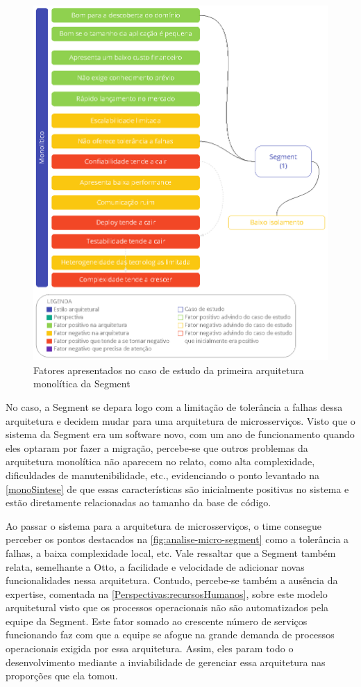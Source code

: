 \begin{figure}[h]
  \centering
  \includegraphics[keepaspectratio=true,scale=1]{figuras/analise-mono-segment-1.eps}
  \caption{Fatores apresentados no caso de estudo da primeira arquitetura monolítica da Segment\label{fig:analise-mono-segment-1}}
\end{figure}

No caso, a Segment se depara logo com a limitação de tolerância a falhas dessa arquitetura e decidem
mudar para uma arquitetura de microsserviços. Visto que o sistema da Segment era um software novo,
com um ano de funcionamento quando eles optaram por fazer a migração, percebe-se que outros problemas
da arquitetura monolítica não aparecem no relato, como alta complexidade, dificuldades de
manutenibilidade, etc., evidenciando o ponto levantado na \autoref{monoSintese} de que essas
características são inicialmente positivas no sistema e estão diretamente relacionadas ao tamanho da
base de código.

Ao passar o sistema para a arquitetura de microsserviços, o time consegue perceber os pontos
destacados na \autoref{fig:analise-micro-segment} como a tolerância a falhas, a baixa complexidade
local, etc. Vale ressaltar que a Segment também relata, semelhante a Otto, a facilidade e velocidade
de adicionar novas funcionalidades nessa arquitetura. Contudo, percebe-se também a ausência da expertise,
comentada na \autoref{Perspectivas:recursosHumanos}, sobre este modelo arquitetural visto que os processos
operacionais não são automatizados pela equipe da Segment. Este fator somado ao crescente número de
serviços funcionando faz com que a equipe se afogue na grande demanda de processos operacionais
exigida por essa arquitetura. Assim, eles param todo o desenvolvimento mediante a inviabilidade de
gerenciar essa arquitetura nas proporções que ela tomou.

